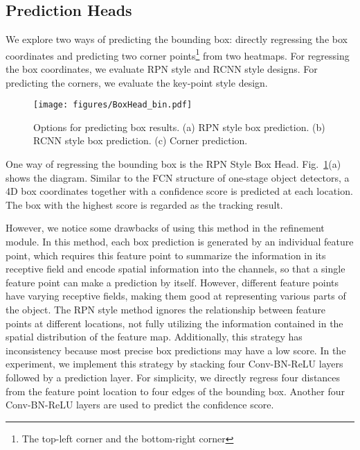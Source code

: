 \documentclass[final]{cvpr}
\begin{document}
\subsection{Prediction Heads}
We explore two ways of predicting the bounding box: directly regressing the box coordinates 
and predicting two corner points\footnote{The top-left corner and the bottom-right corner} 
from two heatmaps. For regressing the box coordinates, we evaluate RPN style and RCNN 
style designs. For predicting the corners, we evaluate the key-point style design.

\begin{figure}[!htb]
\centering
    \texttt{[image: figures/BoxHead\_bin.pdf]}
    \caption{Options for predicting box results. (a) RPN style box prediction. (b) RCNN style box prediction. (c) Corner prediction.} \label{fig:boxhead}
    \vspace{-4mm}
\end{figure}

One way of regressing the bounding box is the RPN Style Box Head. 
Fig.~\ref{fig:boxhead}(a) shows the diagram.
Similar to the FCN structure of one-stage object detectors, a 4D box coordinates 
together with a confidence score is predicted at each location. 
The box with the highest score is regarded as the tracking result. 

However, we notice some drawbacks of using this method in the refinement module.
In this method, each box prediction is generated by an individual feature point, 
which requires this feature point to summarize the information in its receptive field and encode spatial
information into the channels, so that a single feature point can make a prediction by itself.
However, different feature points have varying receptive fields, making them good at representing various parts of the object. 
The RPN style method ignores the relationship between feature points at different locations, not fully utilizing the information
contained in the spatial distribution of the feature map. Additionally, this strategy has inconsistency because most
precise box predictions may have a low score.
In the experiment, we implement this strategy by stacking four Conv-BN-ReLU layers followed by a prediction layer. 
For simplicity, we directly regress four distances from the feature point location to four edges of the bounding box. 
Another four Conv-BN-ReLU layers are used to predict the confidence score. 
\end{document}
